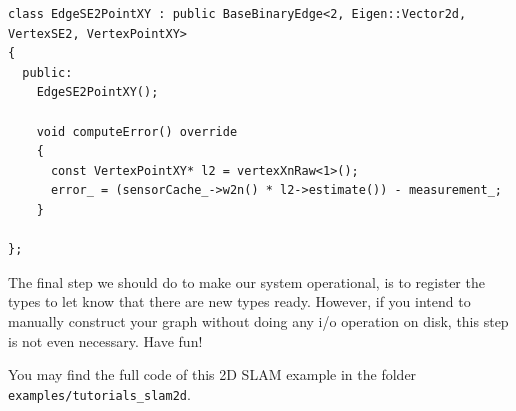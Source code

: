 \documentclass[a4paper]{article}
\begin{document}
\begin{lstlisting}[float,label=lst:edgese2xy,caption=Edge connecting a
  robot poses and a landmark.]
class EdgeSE2PointXY : public BaseBinaryEdge<2, Eigen::Vector2d, VertexSE2, VertexPointXY>
{
  public:
    EdgeSE2PointXY();

    void computeError() override
    {
      const VertexPointXY* l2 = vertexXnRaw<1>();
      error_ = (sensorCache_->w2n() * l2->estimate()) - measurement_;
    }

};
\end{lstlisting}
The final step we should do to make our system operational, is to
register the types to let \gopt{} know that there are new types ready.
However, if you intend to manually construct your graph without doing
any i/o operation on disk, this step is not even necessary. Have fun!

You may find the full code of this 2D SLAM example in the folder
\texttt{examples/tutorials\_slam2d}.

{\small

}
\end{document}
